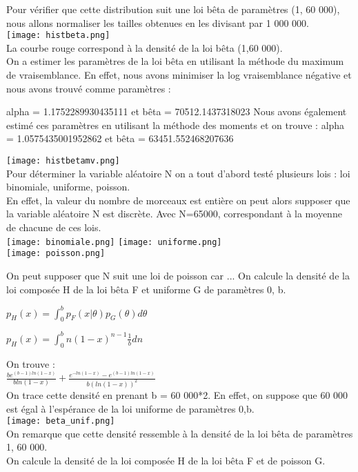 \documentclass{book}
\begin{document}
Pour vérifier que cette distribution suit une loi bêta de paramètres (1, 60 000), nous allons normaliser les tailles obtenues en les divisant par 1 000 000.\\
\texttt{[image: histbeta.png]}\\
La courbe rouge correspond à la densité de la loi bêta (1,60 000).\\
On a estimer les paramètres de la loi bêta en utilisant la méthode du maximum de vraisemblance. En effet, nous avons minimiser la log vraisemblance négative et nous avons trouvé comme paramètres : 

alpha = 1.1752289930435111 et bêta = 70512.1437318023
Nous avons également estimé ces paramètres en utilisant la méthode des moments et on trouve : 
alpha = 1.0575435001952862 et bêta = 63451.552468207636

\texttt{[image: histbetamv.png]}\\
Pour déterminer la variable aléatoire N on a tout d'abord testé plusieurs lois : loi binomiale, uniforme, poisson. \\
En effet, la valeur du nombre de morceaux est entière on peut alors supposer que la variable aléatoire N est discrète.
Avec N=65000, correspondant à la moyenne de chacune de ces lois.
\\
\texttt{[image: binomiale.png]}
\texttt{[image: uniforme.png]}\\
\texttt{[image: poisson.png]}

On peut supposer que N suit une loi de poisson car ...
On calcule la densité de la loi composée H de la loi bêta F et uniforme G de paramètres 0, b.

$p_{H}(x) = \int_{0}^{b} p_{F}(x|\theta) p_{G}(\theta)d\theta$

$p_{H}(x) = \int_{0}^{b}n(1-x)^{n-1}\frac{1}{b}dn$

On trouve : \\
$\frac{be^{(b-1)ln(1-x)}}{bln(1-x)}+\frac{e^{-ln(1-x)}-e^{(b-1)ln(1-x)}}{b(ln(1-x))^2}$\\

On trace cette densité en prenant b = 60 000*2.
En effet, on suppose que 60 000 est égal à l'espérance de la loi uniforme de paramètres 0,b.\\
\texttt{[image: beta\_unif.png]}\\
On remarque que cette densité ressemble à la densité de la loi bêta de paramètres 1, 60 000. \\
On calcule la densité de la loi composée H de la loi bêta F et de poisson G.
\end{document}
